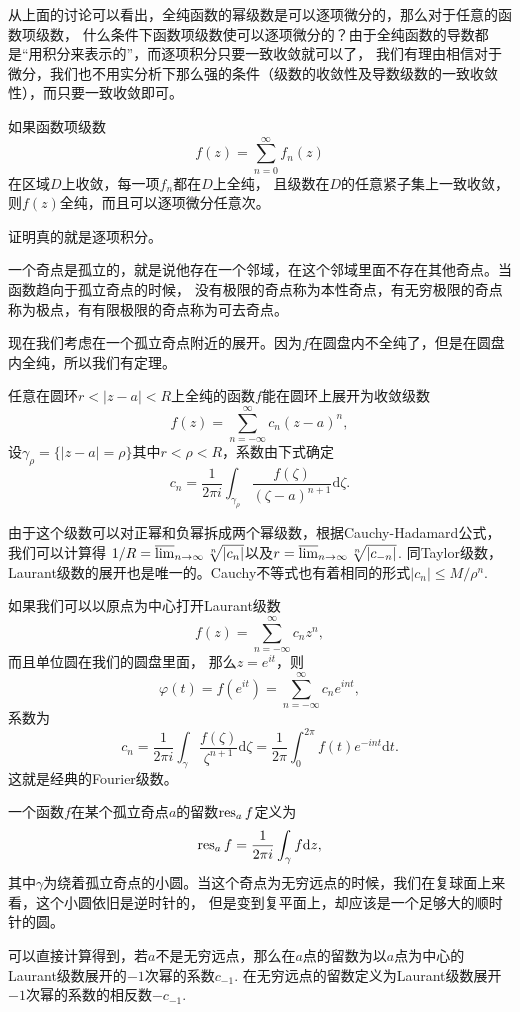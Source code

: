 从上面的讨论可以看出，全纯函数的幂级数是可以逐项微分的，那么对于任意的函数项级数，
什么条件下函数项级数使可以逐项微分的？由于全纯函数的导数都是“用积分来表示的”，而逐项积分只要一致收敛就可以了，
我们有理由相信对于微分，我们也不用实分析下那么强的条件（级数的收敛性及导数级数的一致收敛性），而只要一致收敛即可。

\begin{pro}[Weierstrass]
	如果函数项级数\[f(z)=\sum_{n=0}^\infty f_n(z)\]在区域$D$上收敛，每一项$f_n$都在$D$上全纯，
    且级数在$D$的任意紧子集上一致收敛，则$f(z)$全纯，而且可以逐项微分任意次。
\end{pro}
证明真的就是逐项积分。

一个奇点是孤立的，就是说他存在一个邻域，在这个邻域里面不存在其他奇点。当函数趋向于孤立奇点的时候，
没有极限的奇点称为本性奇点，有无穷极限的奇点称为极点，有有限极限的奇点称为可去奇点。

现在我们考虑在一个孤立奇点附近的展开。因为$f$在圆盘内不全纯了，但是在圆盘内全纯，所以我们有定理。
\begin{pro}[Laurant级数]
	任意在圆环$r<|z-a|<R$上全纯的函数$f$能在圆环上展开为收敛级数\[f(z)=\sum_{n=-\infty}^\infty c_n(z-a)^n,\]
    设$\gamma_\rho=\{|z-a|=\rho\}$其中$r<\rho<R$，系数由下式确定
	\[
	c_n=\frac{1}{2\pi i}\int_{\gamma_\rho}\frac{f(\zeta)}{(\zeta -a)^{n+1}}\mathrm{d}\zeta.
	\]
\end{pro}
由于这个级数可以对正幂和负幂拆成两个幂级数，根据Cauchy-Hadamard公式，我们可以计算得
$1/R=\varlimsup_{n\to \infty} \sqrt[n]{|c_n|}$以及$r=\varlimsup_{n\to \infty} \sqrt[n]{|c_{-n}|}$.
同Taylor级数，Laurant级数的展开也是唯一的。Cauchy不等式也有着相同的形式$|c_n|\leq M/\rho^n$.

如果我们可以以原点为中心打开Laurant级数\[f(z)=\sum_{n=-\infty}^\infty c_nz^n,\]而且单位圆在我们的圆盘里面，
那么$z=e^{it}$，则\[\varphi(t)=f(e^{it})=\sum_{n=-\infty}^\infty c_ne^{int},\]系数为
	\[
	c_n=\frac{1}{2\pi i}\int_{\gamma}\frac{f(\zeta)}{\zeta^{n+1}}\mathrm{d}\zeta=\frac{1}{2\pi}\int_0^{2\pi}
    f(t)e^{-int}\mathrm{d}t.
	\]
这就是经典的Fourier级数。
	
一个函数$f$在某个孤立奇点$a$的留数$\operatorname{res}_af$定义为
\[\operatorname{res}_af=\frac{1}{2\pi i}\int_{\gamma}f\mathrm{d}z,\]
其中$\gamma$为绕着孤立奇点的小圆。当这个奇点为无穷远点的时候，我们在复球面上来看，这个小圆依旧是逆时针的，
但是变到复平面上，却应该是一个足够大的顺时针的圆。
	
可以直接计算得到，若$a$不是无穷远点，那么在$a$点的留数为以$a$点为中心的Laurant级数展开的$-1$次幂的系数$c_{-1}$.
在无穷远点的留数定义为Laurant级数展开$-1$次幂的系数的相反数$-c_{-1}$.
	
